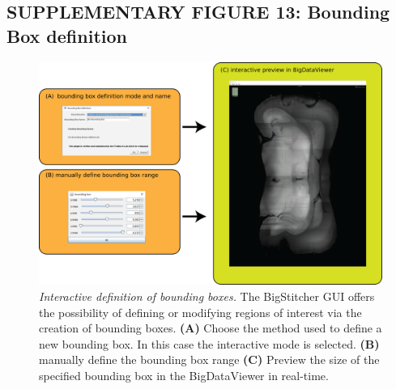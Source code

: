 \documentclass[]{spie}  %
\begin{document}
\subsection*{SUPPLEMENTARY FIGURE 13: Bounding Box definition}
\vspace{1mm}
\begin{figure}[h!]
\includegraphics[width=\textwidth]{Supp-BB.png}
\vspace{-2.0mm}
\caption{\hspace{-0.5mm} \emph{Interactive definition of bounding boxes.} The BigStitcher GUI offers the possibility of defining or modifying regions of interest via the creation of bounding boxes. \textbf{(A)} Choose the method used to define a new bounding box. In this case the interactive mode is selected. \textbf{(B)} manually define the bounding box range \textbf{(C)} Preview the size of the specified bounding box in the BigDataViewer in real-time.
}
\label{fig:sup-fig-boundingbox}
\end{figure}

\pagebreak
\end{document}
